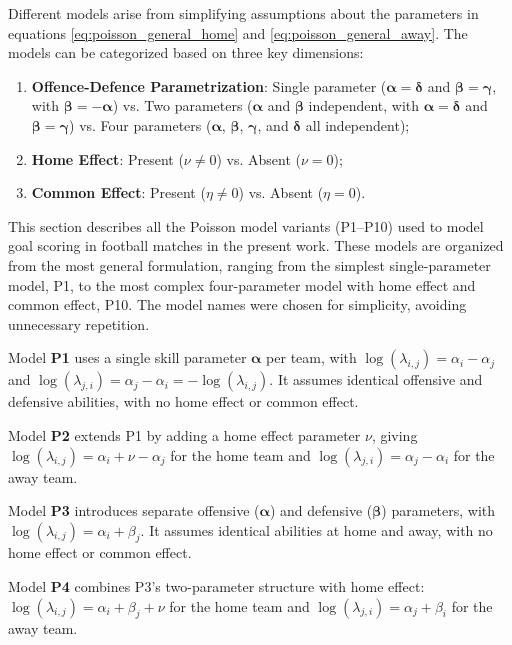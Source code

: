Different models arise from simplifying assumptions about the parameters in equations \ref{eq:poisson_general_home} and \ref{eq:poisson_general_away}. The models can be categorized based on three key dimensions:
\begin{enumerate}
    \item \textbf{Offence-Defence Parametrization}: Single parameter ($\boldsymbol{\alpha} = \boldsymbol{\delta}$ and $\boldsymbol{\beta} = \boldsymbol{\gamma}$, with $\boldsymbol{\beta} = -\boldsymbol{\alpha}$) vs. Two parameters ($\boldsymbol{\alpha}$ and $\boldsymbol{\beta}$ independent, with $\boldsymbol{\alpha} = \boldsymbol{\delta}$ and $\boldsymbol{\beta} = \boldsymbol{\gamma}$) vs. Four parameters ($\boldsymbol{\alpha}$, $\boldsymbol{\beta}$, $\boldsymbol{\gamma}$, and $\boldsymbol{\delta}$ all independent);
    \item \textbf{Home Effect}: Present ($\nu \neq 0$) vs. Absent ($\nu = 0$);
    \item \textbf{Common Effect}: Present ($\eta \neq 0$) vs. Absent ($\eta = 0$).
\end{enumerate}

This section describes all the Poisson model variants (P1--P10) used to model goal scoring in football matches in the present work.
These models are organized from the most general formulation, ranging from the simplest single-parameter model, P1, to the most complex four-parameter model with home effect and common effect, P10.
The model names were chosen for simplicity, avoiding unnecessary repetition.

Model \textbf{P1} uses a single skill parameter $\boldsymbol{\alpha}$ per team, with $\log(\lambda_{i,j}) = \alpha_i - \alpha_j$ and $\log(\lambda_{j,i}) = \alpha_j - \alpha_i = -\log(\lambda_{i,j})$.
It assumes identical offensive and defensive abilities, with no home effect or common effect.

Model \textbf{P2} extends P1 by adding a home effect parameter $\nu$, giving $\log(\lambda_{i,j}) = \alpha_i + \nu - \alpha_j$ for the home team and $\log(\lambda_{j,i}) = \alpha_j - \alpha_i$ for the away team.

Model \textbf{P3} introduces separate offensive ($\boldsymbol{\alpha}$) and defensive ($\boldsymbol{\beta}$) parameters, with $\log(\lambda_{i,j}) = \alpha_i + \beta_j$.
It assumes identical abilities at home and away, with no home effect or common effect.

Model \textbf{P4} combines P3's two-parameter structure with home effect: $\log(\lambda_{i,j}) = \alpha_i + \beta_j + \nu$ for the home team and $\log(\lambda_{j,i}) = \alpha_j + \beta_i$ for the away team.

